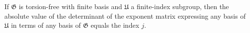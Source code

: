 If $\mathfrak{G}$ is torsion-free with finite basis and $\mathfrak{U}$ a finite-index subgroup, then the absolute value of the determinant of the exponent matrix expressing any basis of $\mathfrak{U}$ in terms of any basis of $\mathfrak{G}$ equals the index $j$.
